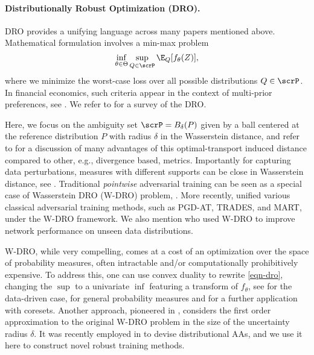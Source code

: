 \paragraph{Distributionally Robust Optimization (DRO).}
DRO provides a unifying language across many papers mentioned above. 
Mathematical formulation involves a min-max problem
\begin{equation}
    \label{eqn-dro}
    \inf_{\theta\in \Theta} \sup_{Q\in\scrP} \E_{Q}[f_{\theta}(Z)],
\end{equation}
where we minimize the worst-case loss over all possible distributions \(Q\in\scrP\). 
In financial economics, such criteria appear in the context of multi-prior preferences, see \citep{GS89,FW15}. We refer to \citep{RM19} for a survey of the DRO. 

Here, we focus on the ambiguity set \(\scrP=B_{\delta}(P)\) given by a ball centered at the reference distribution \(P\) with radius \(\delta\) in the Wasserstein distance, and refer to \citet{GK22} for a discussion of many advantages of this optimal-transport induced distance compared to other, e.g., divergence based, metrics. Importantly for capturing data perturbations, measures with different supports can be close in Wasserstein distance, see \citet{SND18}. Traditional \emph{pointwise} adversarial training can be seen as a special case of Wasserstein DRO (W-DRO) problem, \citet{SJ17}.
More recently, \citet{BLT+22Unified} unified various classical adversarial training methods, such as PGD-AT, TRADES, and MART, under the W-DRO framework. We also mention \citet{volpi2018generalizing} who used W-DRO to improve network performance on unseen data distributions.  

W-DRO, while very compelling, comes at a cost of an optimization over the space of probability measures, often intractable and/or computationally prohibitively expensive. To address this, one can use convex duality to rewrite \eqref{eqn-dro}, changing the $\sup$ to a univariate $\inf$ featuring a transform of $f_\theta$, see \citet{MK18} for the data-driven case, \citet{BM19,BDT20,GK22} for general probability measures and \citet{HHLD22} for a further application with coresets. Another approach, pioneered in \citet{BDOW21}, considers the first order approximation to the original W-DRO problem in the size of the uncertainty radius $\delta$. It was recently employed in \citet{BHJO23Wasserstein} to devise distributional AAs, and we use it here to construct novel robust training methods. 

